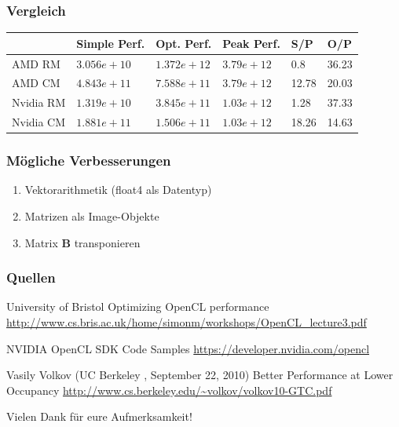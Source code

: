 \documentclass{beamer}
\begin{document}
\begin{frame}
\frametitle{Vergleich}

\begin{tabular}{|l|l|l|l|l|l|}
	\hline  & Simple Perf. & Opt. Perf. & Peak Perf. & S/P & O/P \\ 
	\hline AMD RM & $3.056e+10$ & $1.372e+12$ & $3.79e+12$ & 0.8 & 36.23 \\ 
	\hline AMD CM & $4.843e+11$ & $7.588e+11$ & $3.79e+12$ & 12.78 & 20.03 \\ 
	\hline Nvidia RM & $ 1.319e+10$ & $3.845e+11$ & $1.03e+12$ & 1.28 & 37.33 \\ 
	\hline Nvidia CM & $ 1.881e+11$ & $1.506e+11$ & $1.03e+12$ & 18.26 & 14.63 \\ 
	\hline 
	\end{tabular} 
	
\end{frame}


\begin{frame}
\frametitle{M\"ogliche Verbesserungen}

\begin{enumerate}
\item Vektorarithmetik (float4 als Datentyp)
\item Matrizen als Image-Objekte
\item Matrix \textbf{B} transponieren 
\end{enumerate}

 
\end{frame}














\begin{frame}
\frametitle{Quellen}


\footnotesize{
\begin{thebibliography}{99}
  University of Bristol
 \newblock Optimizing OpenCL performance
 \newblock \url{http://www.cs.bris.ac.uk/home/simonm/workshops/OpenCL_lecture3.pdf} 
\end{thebibliography}
}



\footnotesize{
\begin{thebibliography}{99}
 NVIDIA 
 \newblock OpenCL SDK Code Samples
 \newblock \url{https://developer.nvidia.com/opencl} 
\end{thebibliography}
}


\footnotesize{
\begin{thebibliography}{99}
  Vasily Volkov
(UC Berkeley , September 22, 2010)
 \newblock Better Performance at Lower Occupancy 
 \newblock \url{http://www.cs.berkeley.edu/~volkov/volkov10-GTC.pdf} 
\end{thebibliography}
}





\end{frame}
 
 
 
\begin{frame}
\centerline{Vielen Dank f{\"u}r eure Aufmerksamkeit!}
\end{frame}
\end{document}
